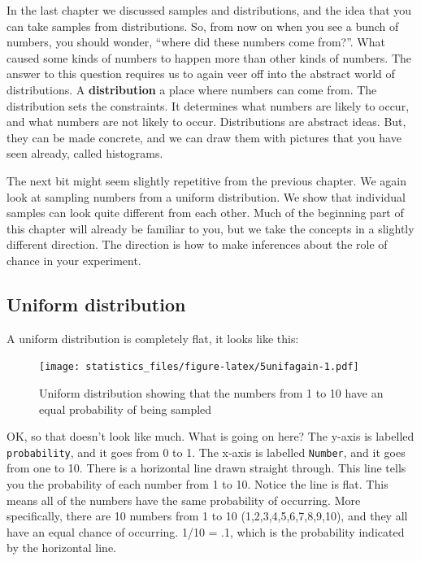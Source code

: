 \documentclass[]{book}
\begin{document}
In the last chapter we discussed samples and distributions, and the idea that you can take samples from distributions. So, from now on when you see a bunch of numbers, you should wonder, ``where did these numbers come from?''. What caused some kinds of numbers to happen more than other kinds of numbers. The answer to this question requires us to again veer off into the abstract world of distributions. A \textbf{distribution} a place where numbers can come from. The distribution sets the constraints. It determines what numbers are likely to occur, and what numbers are not likely to occur. Distributions are abstract ideas. But, they can be made concrete, and we can draw them with pictures that you have seen already, called histograms.

The next bit might seem slightly repetitive from the previous chapter. We again look at sampling numbers from a uniform distribution. We show that individual samples can look quite different from each other. Much of the beginning part of this chapter will already be familiar to you, but we take the concepts in a slightly different direction. The direction is how to make inferences about the role of chance in your experiment.

\hypertarget{uniform-distribution}{%
\subsection{Uniform distribution}\label{uniform-distribution}}

A uniform distribution is completely flat, it looks like this:

\begin{figure}
\centering
\texttt{[image: statistics\_files/figure-latex/5unifagain-1.pdf]}
\caption{\label{fig:5unifagain}Uniform distribution showing that the numbers from 1 to 10 have an equal probability of being sampled}
\end{figure}

OK, so that doesn't look like much. What is going on here? The y-axis is labelled \texttt{probability}, and it goes from 0 to 1. The x-axis is labelled \texttt{Number}, and it goes from one to 10. There is a horizontal line drawn straight through. This line tells you the probability of each number from 1 to 10. Notice the line is flat. This means all of the numbers have the same probability of occurring. More specifically, there are 10 numbers from 1 to 10 (1,2,3,4,5,6,7,8,9,10), and they all have an equal chance of occurring. 1/10 = .1, which is the probability indicated by the horizontal line.
\end{document}

